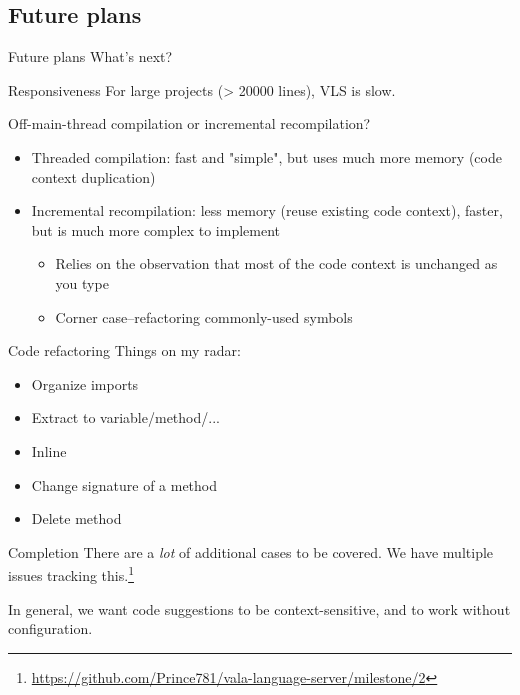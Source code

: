 \documentclass[t]{beamer}
\newcommand{\fancyurl}[1]{\href{#1}{#1}}
\begin{document}
\subsection{Future plans}
\begin{frame}[c]{Future plans}
    What's next?
\end{frame}

\begin{frame}[c]{Responsiveness}
    For large projects (> 20000 lines), VLS is slow.
    
    Off-main-thread compilation or incremental recompilation?
    \begin{itemize}
        \item Threaded compilation: fast and "simple", but uses much more memory (code context duplication)
        \item Incremental recompilation: less memory (reuse existing code context), faster, but is much more complex to implement
        \begin{itemize}
            \item Relies on the observation that most of the code context is unchanged as you type
            \item Corner case--refactoring commonly-used symbols
        \end{itemize}
    \end{itemize}
\end{frame}

\begin{frame}[c]{Code refactoring}
    Things on my radar:
    
    \begin{itemize}
        \item Organize imports
        \item Extract to variable/method/...
        \item Inline
        \item Change signature of a method
        \item Delete method
    \end{itemize}
\end{frame}

\begin{frame}[c]{Completion}  
    There are a \emph{lot} of additional cases to be covered. We have multiple issues tracking this.\footnote{\fancyurl{https://github.com/Prince781/vala-language-server/milestone/2}}
    
    In general, we want code suggestions to be context-sensitive, and to work without configuration.
\end{frame}
\end{document}
